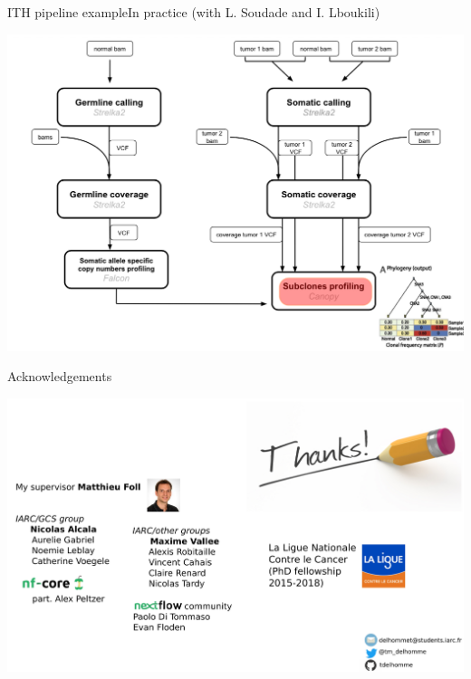 \documentclass[xcolor=table,compress]{beamer} %
\begin{document}
\begin{frame}{ITH pipeline example}{In practice (with L. Soudade and I. Lboukili)}
\begin{center} \includegraphics[scale=0.25]{pictures/ITH-nf.png} \end{center}
\end{frame}

\begin{frame}{Acknowledgements}
\begin{center}
	\includegraphics[scale=0.2]{pictures/thanks.pdf} \\
\end{center}
\end{frame}
\end{document}
